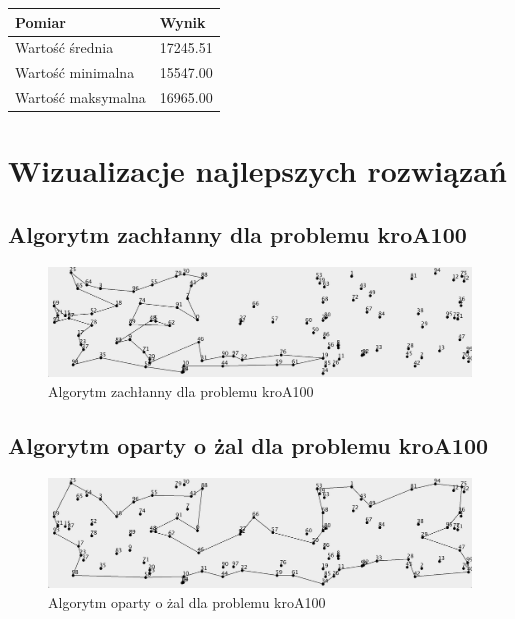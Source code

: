 \documentclass[a4paper]{article}
\begin{document}
\begin{center}
	\begin{tabular}{ l | l }
		\textbf{Pomiar} & \textbf{Wynik} \\
		\hline
		Wartość średnia    & 17245.51 \\
		Wartość minimalna  & 15547.00 \\
		Wartość maksymalna & 16965.00 \\
	\end{tabular}
\end{center}

\section{Wizualizacje najlepszych rozwiązań}

\subsection{Algorytm zachłanny dla problemu kroA100}

\begin{figure}[H]
\centering
\includegraphics[width=\textwidth]{kroA_greedy}
\caption{Algorytm zachłanny dla problemu kroA100}
\end{figure}

\subsection{Algorytm oparty o żal dla problemu kroA100}

\begin{figure}[H]
\centering
\includegraphics[width=\textwidth]{kroA_regret}
\caption{Algorytm oparty o żal dla problemu kroA100}
\end{figure}
\end{document}

